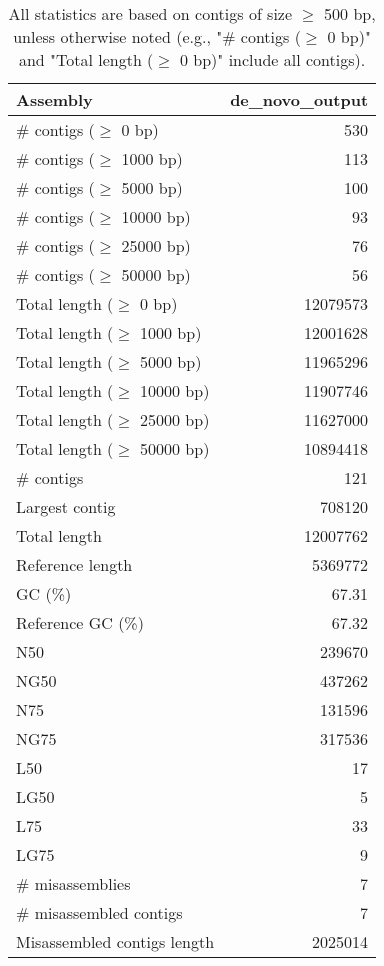 \documentclass[a4paper]{article}
\begin{document}
\begin{table}[ht]
\begin{center}
\caption{All statistics are based on contigs of size $\geq$ 500 bp, unless otherwise noted (e.g., "\# contigs ($\geq$ 0 bp)" and "Total length ($\geq$ 0 bp)" include all contigs).}
\begin{tabular}{|l*{1}{|r}|}
\hline
Assembly & de\_novo\_output \\ \hline
\# contigs ($\geq$ 0 bp) & 530 \\ \hline
\# contigs ($\geq$ 1000 bp) & 113 \\ \hline
\# contigs ($\geq$ 5000 bp) & 100 \\ \hline
\# contigs ($\geq$ 10000 bp) & 93 \\ \hline
\# contigs ($\geq$ 25000 bp) & 76 \\ \hline
\# contigs ($\geq$ 50000 bp) & 56 \\ \hline
Total length ($\geq$ 0 bp) & 12079573 \\ \hline
Total length ($\geq$ 1000 bp) & 12001628 \\ \hline
Total length ($\geq$ 5000 bp) & 11965296 \\ \hline
Total length ($\geq$ 10000 bp) & 11907746 \\ \hline
Total length ($\geq$ 25000 bp) & 11627000 \\ \hline
Total length ($\geq$ 50000 bp) & 10894418 \\ \hline
\# contigs & 121 \\ \hline
Largest contig & 708120 \\ \hline
Total length & 12007762 \\ \hline
Reference length & 5369772 \\ \hline
GC (\%) & 67.31 \\ \hline
Reference GC (\%) & 67.32 \\ \hline
N50 & 239670 \\ \hline
NG50 & 437262 \\ \hline
N75 & 131596 \\ \hline
NG75 & 317536 \\ \hline
L50 & 17 \\ \hline
LG50 & 5 \\ \hline
L75 & 33 \\ \hline
LG75 & 9 \\ \hline
\# misassemblies & 7 \\ \hline
\# misassembled contigs & 7 \\ \hline
Misassembled contigs length & 2025014 \\ \hline

\end{tabular}
\end{center}
\end{table}
\end{document}
